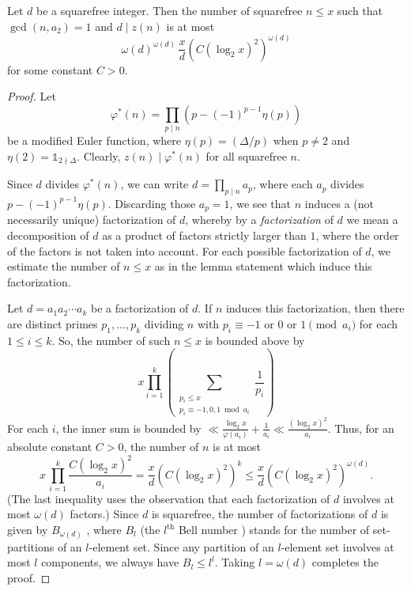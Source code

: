 \documentclass[10pt,a4paper]{amsart}
\begin{document}
\begin{lemma}\label{lemma 2.4}
    Let $d$ be a squarefree integer. Then the number of squarefree $n\le x$ such that $\gcd(n,a_2)=1$ and $d\mid z(n)$ is at most \[\omega(d)^{\omega(d)} \,\frac{x}{d} (C (\log_{2}x)^2)^{\omega(d)}\] for some constant $C>0$.
\end{lemma}

\begin{proof}
    Let \[\varphi^{*}(n)=\prod_{p\mid n} \left(p - (-1)^{p-1}\eta(p)\right)\] be a modified Euler function, where $\eta(p)=(\Delta/p)$ when $p\neq 2$ and $\eta(2)= \mathds{1}_{2\nmid \Delta}$. Clearly, $z(n) \mid \varphi^{*}(n)$ for all squarefree $n$. 
    
Since $d$ divides $\varphi^{*}(n)$, we can write $d = \prod_{p \mid n} a_p$, where each $a_p$ divides $p - (-1)^{p-1}\eta(p)$. Discarding those $a_p = 1$, we see that $n$ induces a (not necessarily unique) factorization of $d$, whereby by a \emph{factorization} of $d$ we mean a decomposition of $d$ as a product of factors strictly larger than $1$, where the order of the factors is not taken into account. For each possible factorization of $d$, we estimate the number of $n \leq x$ as in the lemma statement which induce this factorization.

Let $d = a_1 a_2 \cdots a_k$ be a factorization of $d$. If $n$ induces this factorization, then there are distinct primes $p_1, \ldots, p_k$ dividing $n$ with $p_i \equiv -1\text{ or }0\text{ or }1 \pmod{a_i}$ for each $1 \leq i \leq k$. So, the number of such $n \leq x$ is bounded above by 
\[x\prod_{i=1}^{k}\left(\sum_{\substack{p_i\le x\\ p_i\equiv -1,0,1\bmod{a_i}}}\frac1{p_i}\right)\]
For each $i$, the inner sum is bounded by $\ll \frac{\log_{2} x}{\varphi(a_i)}+\frac1{a_i}\ll \frac{(\log_{2} x)^{2}}{a_i}$. Thus, for an absolute constant $C>0$, the number of $n$ is at most 
$$
x \, \prod_{i=1}^k \frac{C (\log_2 x)^{2}}{a_i} 
= \frac{x}{d} (C (\log_2 x)^{2})^k 
\leq \frac{x}{d} (C (\log_2 x)^{2})^{\omega(d)}.$$ (The last inequality uses the observation that each factorization of $d$ involves at most $\omega(d)$
factors.) Since $d$ is squarefree, the number of factorizations of $d$ is given by $B_{\omega(d)}$
, where $B_l$
(the $l^{\text{th}}$ Bell number ) stands for the number of set-partitions of an $l$-element set.
Since any partition of an $l$-element set involves at most $l$ components, we always
have $B_l\le  l^{l}$. Taking $l = \omega(d)$ completes the proof.
\end{proof}
\end{document}
